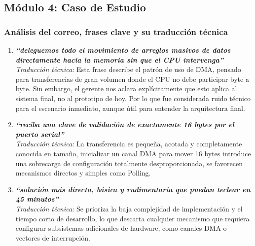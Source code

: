 \documentclass[12pt,letterpaper]{article}
\begin{document}
\newpage

\subsection*{Módulo 4: Caso de Estudio}

\subsubsection*{Análisis del correo, frases clave y su traducción técnica}

\begin{enumerate}[leftmargin=*, label=\textbf{\arabic*.}]
  
\item \textit{\textbf{``deleguemos todo el movimiento de arreglos masivos de datos directamente hacia la memoria sin que el CPU intervenga''}}\\
  
  \textit{Traducción técnica:} Esta frase describe el patrón de uso de DMA, pensado para transferencias de gran
  volumen donde el CPU no debe participar byte a byte. Sin embargo, el gerente nos aclara explícitamente que esto
  aplica al sistema final, no al prototipo de hoy. Por lo que fue considerada ruido técnico para el escenario
  inmediato, aunque útil para entender la arquitectura final.
  
\item \textit{\textbf{``reciba una clave de validación de exactamente 16 bytes por el puerto serial''}}\\

  \textit{Traducción técnica:} La transferencia es pequeña, acotada y completamente conocida en tamaño,
  inicializar un canal DMA para mover 16 bytes introduce una sobrecarga de configuración totalmente
  desproporcionada, se favorecen mecanismos directos y simples como Polling.
  
\item \textit{\textbf{``solución más directa, básica y rudimentaria que puedan teclear en 45 minutos''}}\\
  
  \textit{Traducción técnica:} Se prioriza la baja complejidad de implementación y el tiempo corto de desarrollo,
  lo que descarta cualquier mecanismo que requiera configurar subsistemas adicionales de hardware, como canales
  DMA o vectores de interrupción.
  

\end{enumerate}
\end{document}
